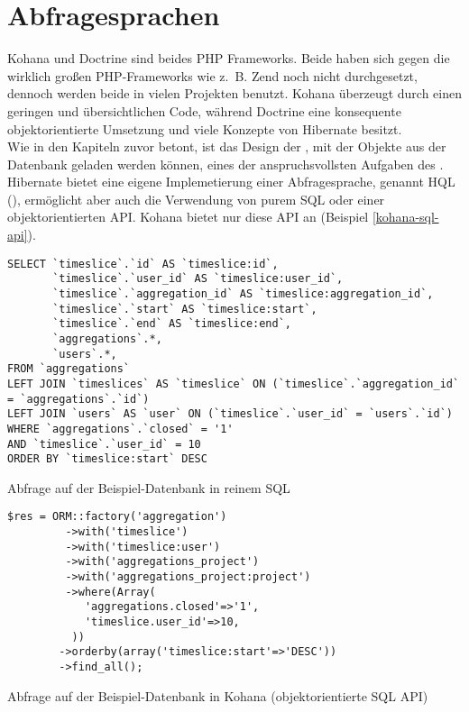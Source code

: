 \section{Abfragesprachen}

Kohana \cite{kohana} und Doctrine \cite{doctrine} sind beides PHP Frameworks. Beide haben sich gegen die wirklich großen PHP-Frameworks wie z.~B. Zend noch nicht durchgesetzt, dennoch werden beide in vielen Projekten benutzt. Kohana überzeugt durch einen geringen und übersichtlichen Code, während Doctrine eine konsequente objektorientierte Umsetzung und viele Konzepte von Hibernate besitzt. \\
Wie in den Kapiteln zuvor betont, ist das Design der , mit der Objekte aus der Datenbank geladen werden können, eines der anspruchsvollsten Aufgaben des \ORM. Hibernate bietet eine eigene Implemetierung einer Abfragesprache, genannt HQL (), ermöglicht aber auch die Verwendung von purem SQL oder einer objektorientierten API. Kohana bietet nur diese API an (Beispiel \ref{kohana-sql-api}). \\
\begin{fexample} 
\lstset{style=SQL}
\begin{lstlisting}
SELECT `timeslice`.`id` AS `timeslice:id`,
       `timeslice`.`user_id` AS `timeslice:user_id`,
       `timeslice`.`aggregation_id` AS `timeslice:aggregation_id`,
       `timeslice`.`start` AS `timeslice:start`,
       `timeslice`.`end` AS `timeslice:end`,
       `aggregations`.*,
       `users`.*,
FROM `aggregations`
LEFT JOIN `timeslices` AS `timeslice` ON (`timeslice`.`aggregation_id` = `aggregations`.`id`)
LEFT JOIN `users` AS `user` ON (`timeslice`.`user_id` = `users`.`id`)
WHERE `aggregations`.`closed` = '1'
AND `timeslice`.`user_id` = 10
ORDER BY `timeslice:start` DESC
\end{lstlisting}
\caption{Abfrage auf der Beispiel-Datenbank in reinem SQL}
\end{fexample}
\begin{fexample} 
\lstset{style=php}
\begin{lstlisting}
$res = ORM::factory('aggregation')
         ->with('timeslice')
         ->with('timeslice:user')
         ->with('aggregations_project')
         ->with('aggregations_project:project')
         ->where(Array(
            'aggregations.closed'=>'1',
            'timeslice.user_id'=>10,
          ))
        ->orderby(array('timeslice:start'=>'DESC'))
        ->find_all();
\end{lstlisting}
\caption{Abfrage auf der Beispiel-Datenbank in Kohana (objektorientierte SQL API)}
\label{kohana-sql-api}
\end{fexample}
